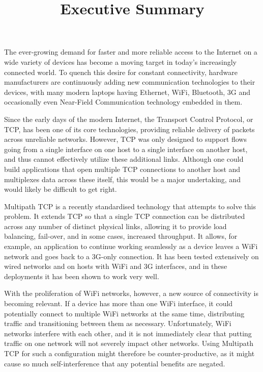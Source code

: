 \documentclass[12pt,a4paper]{article}
\title{\vspace{-5ex}Executive Summary}
\author{\vspace{-5ex}}
\date{\vspace{-5ex}}
\begin{document}
\maketitle
\onehalfspacing
The ever-growing demand for faster and more reliable access to the Internet on a
wide variety of devices has become a moving target in today's increasingly
connected world. To quench this desire for constant connectivity, hardware
manufacturers are continuously adding new communication technologies to their
devices, with many modern laptops having Ethernet, WiFi, Bluetooth, 3G and
occasionally even Near-Field Communication technology embedded in them.

Since the early days of the modern Internet, the Transport Control Protocol, or
TCP, has been one of its core technologies, providing reliable delivery of
packets across unreliable networks. However, TCP was only designed to support
flows going from a single interface on one host to a single interface on another
host, and thus cannot effectively utilize these additional links. Although one
could build applications that open multiple TCP connections to another host and
multiplexes data across these itself, this would be a major undertaking, and
would likely be difficult to get right.

Multipath TCP is a recently standardised technology that attempts to solve this
problem. It extends TCP so that a single TCP connection can be distributed
across any number of distinct physical links, allowing it to provide load
balancing, fail-over, and in some cases, increased throughput. It allows, for
example, an application to continue working seamlessly as a device leaves a WiFi
network and goes back to a 3G-only connection. It has been tested extensively on
wired networks and on hosts with WiFi and 3G interfaces, and in these
deployments it has been shown to work very well.

With the proliferation of WiFi networks, however, a new source of connectivity
is becoming relevant. If a device has more than one WiFi interface, it could
potentially connect to multiple WiFi networks at the same time, distributing
traffic and transitioning between them as necessary. Unfortunately, WiFi
networks interfere with each other, and it is not immediately clear that putting
traffic on one network will not severely impact other networks. Using Multipath
TCP for such a configuration might therefore be counter-productive, as it might
cause so much self-interference that any potential benefits are negated.
\end{document}
